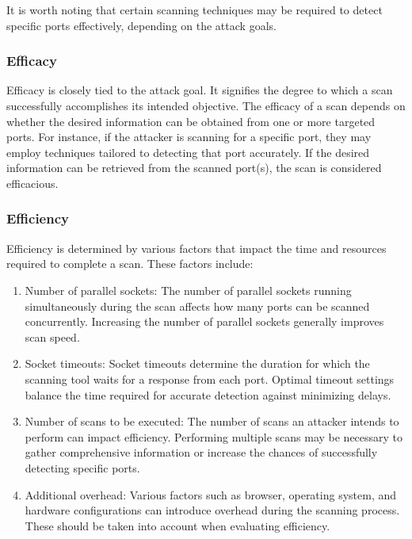 It is worth noting that certain scanning techniques may be required to detect specific ports effectively, depending on the attack goals.

\subsubsection{Efficacy}

Efficacy is closely tied to the attack goal. 
It signifies the degree to which a scan successfully accomplishes its intended objective. 
The efficacy of a scan depends on whether the desired information can be obtained from one or more targeted ports.
For instance, if the attacker is scanning for a specific port, they may employ techniques tailored to detecting that port accurately. If the desired information can be retrieved from the scanned port(s), the scan is considered efficacious.

\subsubsection{Efficiency}

Efficiency is determined by various factors that impact the time and resources required to complete a scan. These factors include:

\begin{enumerate}[label=\alph*.]
    \item Number of parallel sockets: The number of parallel sockets running simultaneously during the scan affects how many ports can be scanned concurrently. Increasing the number of parallel sockets generally improves scan speed.
    
    \item Socket timeouts: Socket timeouts determine the duration for which the scanning tool waits for a response from each port. Optimal timeout settings balance the time required for accurate detection against minimizing delays.
    
    \item Number of scans to be executed: The number of scans an attacker intends to perform can impact efficiency. Performing multiple scans may be necessary to gather comprehensive information or increase the chances of successfully detecting specific ports.
    
    \item Additional overhead: Various factors such as browser, operating system, and hardware configurations can introduce overhead during the scanning process. These should be taken into account when evaluating efficiency.
\end{enumerate}

